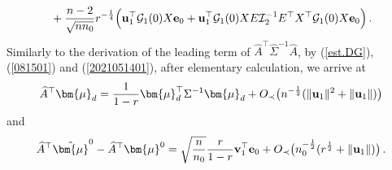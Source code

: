 \documentclass[12pt]{article}
\numberwithin{equation}{section}
\theoremstyle{remark}
\newcommand{\1}{{\rm 1}\kern-0.24em{\rm I}}
\begin{document}
\begin{appendices}
\begin{align*}
& \quad + \frac{n-2}{\sqrt{nn_0}} r^{-\frac 14} \Big( {\bf u}_1^{\top}  \mathcal{G}_1(0)  {X}{\bf e}_0+ {\bf u}_1^{\top} \mathcal{G}_1(0){X}{E} \mathcal{I}_2^{-1}{E}^{\top} {X}^{\top} \mathcal{G}_1(0) {X}{\bf e}_0\Big)\, .
\end{align*}
%
Similarly to the derivation of the leading term of $\widehat A^{\top} \widehat\Sigma^{-1} \widehat A$, by (\ref{est.DG}),  (\ref{081501}) and (\ref{2021051401}), after elementary calculation, we arrive at 
\begin{align*}
\widehat{A} ^{\top} {\bm{\mu}}_d = \frac{1}{1-r} {\bm {\mu}}_d^{\top} \Sigma^{-1} {\bm {\mu}}_d +  O_\prec \big(n^{-\frac 12} (\Vert {\bf u}_1\Vert^2 + \Vert {\bf u}_1\Vert )\big)
\end{align*}
and 
 \begin{align*}
\widehat{A} ^{\top} \hat{\bm{\mu}}^0 - \widehat{A} ^{\top} {\bm{\mu}}^0  =\sqrt{\frac{n}{n_0}} \frac{r}{1-r} {\bf v}_1^{\top} {\bf e}_0  + O_\prec\big(n_0^{-\frac 12} (r^{\frac 12}  + \Vert {\bf u}_1\Vert)\big)\,.
\end{align*}

\end{appendices}
\end{document}
